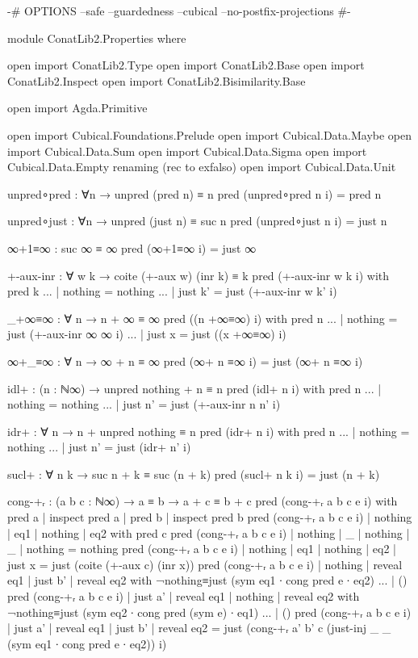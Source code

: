\begin{code}[hide]
{-# OPTIONS --safe --guardedness --cubical --no-postfix-projections #-}

module ConatLib2.Properties where

open import ConatLib2.Type
open import ConatLib2.Base
open import ConatLib2.Inspect
open import ConatLib2.Bisimilarity.Base

open import Agda.Primitive

open import Cubical.Foundations.Prelude
open import Cubical.Data.Maybe
open import Cubical.Data.Sum
open import Cubical.Data.Sigma
open import Cubical.Data.Empty
  renaming (rec to exfalso)
open import Cubical.Data.Unit

unpred∘pred : ∀{n} → unpred (pred n) ≡ n
pred (unpred∘pred {n} i) = pred n

unpred∘just : ∀{n} → unpred (just n) ≡ suc n
pred (unpred∘just {n} i) = just n

∞+1≡∞ : suc ∞ ≡ ∞
pred (∞+1≡∞ i) = just ∞

+-aux-inr : ∀ w k → coite (+-aux w) (inr k) ≡ k
pred (+-aux-inr w k i) with pred k
... | nothing = nothing
... | just k' = just (+-aux-inr w k' i)

_+∞≡∞ : ∀ n → n + ∞ ≡ ∞
pred ((n +∞≡∞) i) with pred n
... | nothing = just (+-aux-inr ∞ ∞ i)
... | just x = just ((x +∞≡∞) i)

∞+_≡∞ : ∀ n → ∞ + n ≡ ∞
pred (∞+ n ≡∞ i) = just (∞+ n ≡∞ i)

idl+ : (n : ℕ∞) → unpred nothing + n ≡ n
pred (idl+ n i) with pred n
... | nothing = nothing
... | just n' = just (+-aux-inr n n' i)

idr+ : ∀ n → n + unpred nothing ≡ n
pred (idr+ n i) with pred n
... | nothing = nothing
... | just n' = just (idr+ n' i)

sucl+ : ∀ n k → suc n + k ≡ suc (n + k)
pred (sucl+ n k i) = just (n + k)

cong-+ᵣ : (a b c : ℕ∞) → a ≡ b → a + c ≡ b + c
pred (cong-+ᵣ a b c e i) with pred a | inspect pred a | pred b | inspect pred b
pred (cong-+ᵣ a b c e i) | nothing | eq1 | nothing | eq2 with pred c
pred (cong-+ᵣ a b c e i) | nothing | _   | nothing | _   | nothing = nothing
pred (cong-+ᵣ a b c e i) | nothing | eq1 | nothing | eq2 | just x = just (coite (+-aux c) (inr x))
pred (cong-+ᵣ a b c e i) | nothing | reveal eq1 | just b' | reveal eq2 with ¬nothing≡just (sym eq1 ∙ cong pred e ∙ eq2)
... | ()
pred (cong-+ᵣ a b c e i) | just a' | reveal eq1 | nothing | reveal eq2 with ¬nothing≡just (sym eq2 ∙ cong pred (sym e) ∙ eq1)
... | ()
pred (cong-+ᵣ a b c e i) | just a' | reveal eq1 | just b' | reveal eq2 = just (cong-+ᵣ a' b' c (just-inj _ _ (sym eq1 ∙ cong pred e ∙ eq2)) i)


\end{code}

